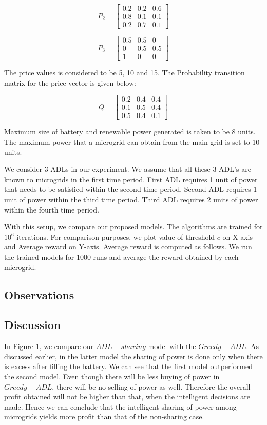 \[
P_{2}=
\begin{bmatrix}
0.2 & 0.2 & 0.6 \\
0.8 & 0.1 & 0.1 \\
0.2 & 0.7 & 0.1
\end{bmatrix}
\]

\[
P_{3}=
\begin{bmatrix}
0.5 & 0.5 & 0 \\
0 & 0.5 & 0.5 \\
1 & 0 & 0
\end{bmatrix}
\]




The price values is considered to be 5, 10 and 15. The Probability transition matrix for the price vector is given below:



\[
Q=
\begin{bmatrix}
0.2 & 0.4 & 0.4 \\
0.1 & 0.5 & 0.4 \\
0.5 & 0.4 & 0.1
\end{bmatrix}
\]


Maximum size of battery and renewable power generated is taken to be 8 units. The maximum power that a microgrid can obtain from the main grid is set to 10 units.

We consider 3 ADLs in our experiment. We assume that all these 3 ADL's are known to microgrids in the first time period. First ADL requires 1 unit of power that needs to be satisfied within the second time period. Second ADL requires 1 unit of power within the third time period. Third ADL requires 2 units of power within the fourth time period.

With this setup, we compare our proposed models. The algorithms are trained for $10^6$ iterations. For comparison purposes, we plot value of threshold $c$ on X-axis and Average reward on Y-axis. Average reward is computed as follows. We run the trained models for 1000 runs and average the reward obtained by each microgrid. 

\subsection{Observations}

\subsection{Discussion}

In Figure 1, we compare our $ADL-sharing$ model with the $Greedy- ADL$. As discussed earlier, in the latter model the sharing of power is done only when there is excess after filling the battery. We can see that the first model outperformed the second model. Even though there will be less buying of power in $Greedy-ADL$, there will be no selling of power as well. Therefore  the overall profit obtained will not be higher than that, when the intelligent decisions are made. Hence we can conclude that the intelligent sharing of power among microgrids yields more profit than that of the non-sharing case. 

